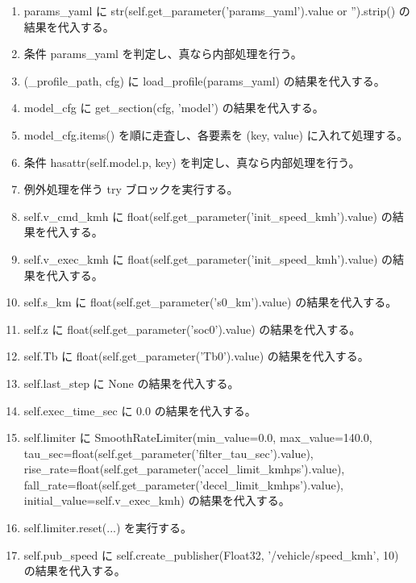 \documentclass[a4paper,11pt]{article}
\begin{document}
\begin{enumerate}[leftmargin=1.8em]
\item params\_yaml に str(self.get\_parameter('params\_yaml').value or '').strip() の結果を代入する。
\item 条件 params\_yaml を判定し、真なら内部処理を行う。
\item   (\_profile\_path, cfg) に load\_profile(params\_yaml) の結果を代入する。
\item   model\_cfg に get\_section(cfg, 'model') の結果を代入する。
\item   model\_cfg.items() を順に走査し、各要素を (key, value) に入れて処理する。
\item     条件 hasattr(self.model.p, key) を判定し、真なら内部処理を行う。
\item       例外処理を伴う try ブロックを実行する。
\item self.v\_cmd\_kmh に float(self.get\_parameter('init\_speed\_kmh').value) の結果を代入する。
\item self.v\_exec\_kmh に float(self.get\_parameter('init\_speed\_kmh').value) の結果を代入する。
\item self.s\_km に float(self.get\_parameter('s0\_km').value) の結果を代入する。
\item self.z に float(self.get\_parameter('soc0').value) の結果を代入する。
\item self.Tb に float(self.get\_parameter('Tb0').value) の結果を代入する。
\item self.last\_step に None の結果を代入する。
\item self.exec\_time\_sec に 0.0 の結果を代入する。
\item self.limiter に SmoothRateLimiter(min\_value=0.0, max\_value=140.0, tau\_sec=float(self.get\_parameter('filter\_tau\_sec').value), rise\_rate=float(self.get\_parameter('accel\_limit\_kmhps').value), fall\_rate=float(self.get\_parameter('decel\_limit\_kmhps').value), initial\_value=self.v\_exec\_kmh) の結果を代入する。
\item self.limiter.reset(...) を実行する。
\item self.pub\_speed に self.create\_publisher(Float32, '/vehicle/speed\_kmh', 10) の結果を代入する。
            \end{enumerate}
\end{document}
